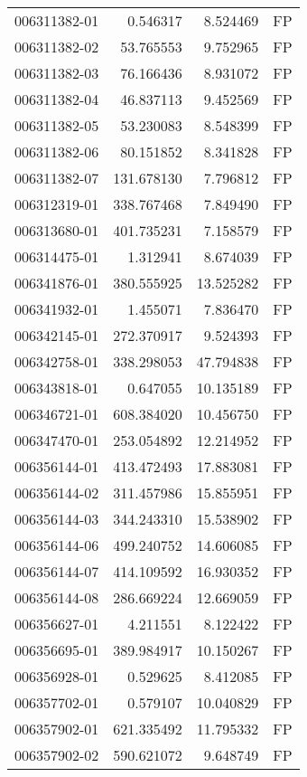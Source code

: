 \begin{tabular}{lrrl}
006311382-01 &    0.546317 &     8.524469 &   FP \\
006311382-02 &   53.765553 &     9.752965 &   FP \\
006311382-03 &   76.166436 &     8.931072 &   FP \\
006311382-04 &   46.837113 &     9.452569 &   FP \\
006311382-05 &   53.230083 &     8.548399 &   FP \\
006311382-06 &   80.151852 &     8.341828 &   FP \\
006311382-07 &  131.678130 &     7.796812 &   FP \\
006312319-01 &  338.767468 &     7.849490 &   FP \\
006313680-01 &  401.735231 &     7.158579 &   FP \\
006314475-01 &    1.312941 &     8.674039 &   FP \\
006341876-01 &  380.555925 &    13.525282 &   FP \\
006341932-01 &    1.455071 &     7.836470 &   FP \\
006342145-01 &  272.370917 &     9.524393 &   FP \\
006342758-01 &  338.298053 &    47.794838 &   FP \\
006343818-01 &    0.647055 &    10.135189 &   FP \\
006346721-01 &  608.384020 &    10.456750 &   FP \\
006347470-01 &  253.054892 &    12.214952 &   FP \\
006356144-01 &  413.472493 &    17.883081 &   FP \\
006356144-02 &  311.457986 &    15.855951 &   FP \\
006356144-03 &  344.243310 &    15.538902 &   FP \\
006356144-06 &  499.240752 &    14.606085 &   FP \\
006356144-07 &  414.109592 &    16.930352 &   FP \\
006356144-08 &  286.669224 &    12.669059 &   FP \\
006356627-01 &    4.211551 &     8.122422 &   FP \\
006356695-01 &  389.984917 &    10.150267 &   FP \\
006356928-01 &    0.529625 &     8.412085 &   FP \\
006357702-01 &    0.579107 &    10.040829 &   FP \\
006357902-01 &  621.335492 &    11.795332 &   FP \\
006357902-02 &  590.621072 &     9.648749 &   FP \\

\end{tabular}
